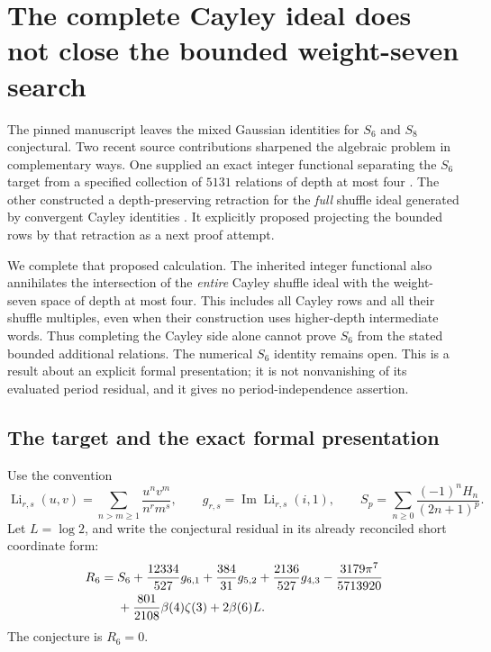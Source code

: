 \providecommand{\shuffle}{\mathbin{\amalg}}
\section{The complete Cayley ideal does not close the bounded weight-seven search}
\label{gf:sec}

The pinned manuscript leaves the mixed Gaussian identities for $S_6$ and
$S_8$ conjectural. Two recent source contributions sharpened the algebraic
problem in complementary ways. One supplied an exact integer functional
separating the $S_6$ target from a specified collection of $5131$ relations
of depth at most four \cite{gf:Bounded}. The other constructed a
depth-preserving retraction for the \emph{full} shuffle ideal generated by
convergent Cayley identities \cite{gf:Depth}. It explicitly proposed
projecting the bounded rows by that retraction as a next proof attempt.

We complete that proposed calculation. The inherited integer functional
also annihilates the intersection of the \emph{entire} Cayley shuffle ideal
with the weight-seven space of depth at most four. This includes all
Cayley rows and all their shuffle multiples, even when their construction
uses higher-depth intermediate words. Thus completing the Cayley side
alone cannot prove $S_6$ from the stated bounded additional relations.
The numerical $S_6$ identity remains open. This is a result about an
explicit formal presentation; it is not nonvanishing of its evaluated
period residual, and it gives no period-independence assertion.

\subsection{The target and the exact formal presentation}

Use the convention
\[
 \operatorname{Li}_{r,s}(u,v)=\sum_{n>m\geq1}\frac{u^n v^m}{n^r m^s},
 \qquad g_{r,s}=\operatorname{Im}\operatorname{Li}_{r,s}(i,1),
 \qquad S_p=\sum_{n\geq0}\frac{(-1)^nH_n}{(2n+1)^p}.
\]
Let $L=\log2$, and write the conjectural residual in its already reconciled
short coordinate form:
\begin{align}
 R_6={}&S_6+\frac{12334}{527}g_{6,1}+\frac{384}{31}g_{5,2}
       +\frac{2136}{527}g_{4,3}-\frac{3179\pi^7}{5713920}\notag\\
      &+\frac{801}{2108}\beta(4)\zeta(3)+2\beta(6)L.
 \label{gf:eq:residual}
\end{align}
The conjecture is $R_6=0$.

